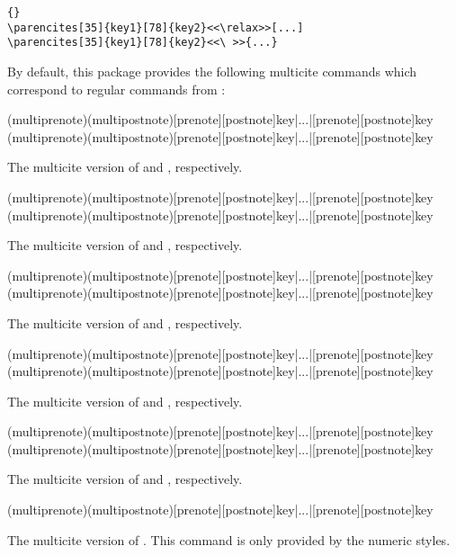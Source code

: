 \documentclass{ltxdockit}[2011/03/25]
\begin{document}
\begin{lstlisting}[style=latex,showspaces]{}
\parencites[35]{key1}[78]{key2}<<\relax>>[...]
\parencites[35]{key1}[78]{key2}<<\ >>{...}
\end{lstlisting}
%
By default, this package provides the following multicite commands which correspond to regular commands from :

\begin{ltxsyntax}

(multiprenote)(multipostnote)[prenote][postnote]{key}|...|[prenote][postnote]{key}
(multiprenote)(multipostnote)[prenote][postnote]{key}|...|[prenote][postnote]{key}

The multicite version of  and , respectively.

(multiprenote)(multipostnote)[prenote][postnote]{key}|...|[prenote][postnote]{key}
(multiprenote)(multipostnote)[prenote][postnote]{key}|...|[prenote][postnote]{key}

The multicite version of  and , respectively.

(multiprenote)(multipostnote)[prenote][postnote]{key}|...|[prenote][postnote]{key}
(multiprenote)(multipostnote)[prenote][postnote]{key}|...|[prenote][postnote]{key}

The multicite version of  and , respectively.

(multiprenote)(multipostnote)[prenote][postnote]{key}|...|[prenote][postnote]{key}
(multiprenote)(multipostnote)[prenote][postnote]{key}|...|[prenote][postnote]{key}

The multicite version of  and , respectively.

(multiprenote)(multipostnote)[prenote][postnote]{key}|...|[prenote][postnote]{key}
(multiprenote)(multipostnote)[prenote][postnote]{key}|...|[prenote][postnote]{key}

The multicite version of  and , respectively.

(multiprenote)(multipostnote)[prenote][postnote]{key}|...|[prenote][postnote]{key}

The multicite version of . This command is only provided by the numeric styles.

\end{ltxsyntax}
\end{document}
